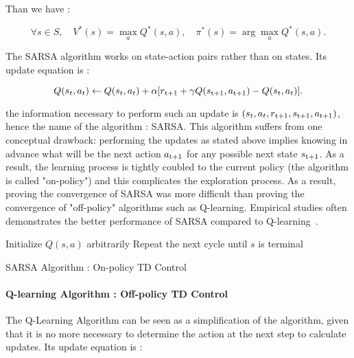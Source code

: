 Than we have :

\begin{equation}
\forall s \in S, \quad V^*(s) = \max_{a} Q^* (s,a ), \quad \pi^*(s) = \arg\max_{a} Q^*(s,a).
\end{equation}

The SARSA algorithm works on state-action pairs rather than on states. Its update equation is :

\begin{equation}
\label{eq:2.12}
Q(s_t, a_t) \leftarrow Q(s_t, a_t) + \alpha[r\textsubscript{t+1} + \gamma Q(s\textsubscript{t+1}, a\textsubscript{t+1}) - Q(s_t, a_t)].
\end{equation}

the information necessary to perform such an update is $(s_t, a_t, r\textsubscript{t+1}, s\textsubscript{t+1}, a\textsubscript{t+1})$, hence the name of the algorithm : SARSA. This algorithm suffers from one conceptual drawback: performing the updates as stated above implies knowing in advance what will be the next action $a\textsubscript{t+1}$ for any possible next state $s\textsubscript{t+1}$.  As a result, the learning process is tightly coubled to the current policy (the algorithm is called "on-policy") and this complicates the exploration process. As a result, proving the convergence of SARSA was more difficult than proving the convergence of "off-policy" algorithms such as Q-learning. Empirical studies often demonstrates the better performance of SARSA compared to Q-learning~\cite{Sigaud:2010:MDP:1841781}.

\begin{algorithm}
	Initialize $Q(s, a)$ arbitrarily\;
	Repeat the next cycle until $s$ is terminal\;
\caption{SARSA Algorithm : On-policy TD Control}
\end{algorithm}

\paragraph{Q-learning Algorithm : Off-policy TD Control} The Q-Learning Algorithm can be seen as a simplification of the  algorithm, given that it is no more necessary to determine the action at the next step to calculate updates. Its update equation is :

